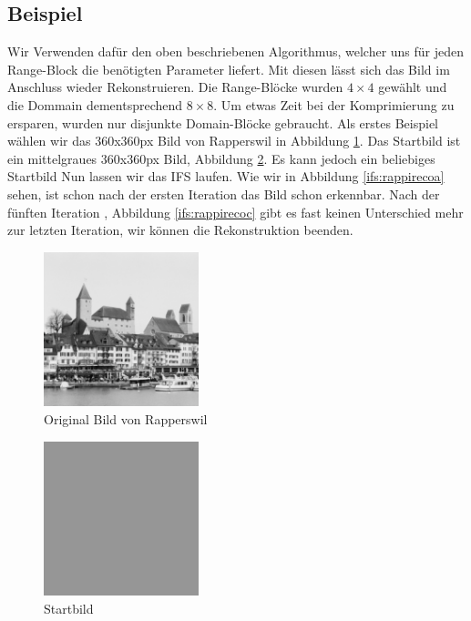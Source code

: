 \subsection{Beispiel}
Wir Verwenden dafür den oben beschriebenen Algorithmus, welcher uns für jeden Range-Block die benötigten Parameter liefert.
Mit diesen lässt sich das Bild im Anschluss wieder Rekonstruieren.
Die Range-Blöcke wurden $4\times4$ gewählt und die Dommain dementsprechend $8\times8$.
Um etwas Zeit bei der Komprimierung zu ersparen, wurden nur disjunkte Domain-Blöcke gebraucht.
Als erstes Beispiel wählen wir das 360x360px Bild von Rapperswil in Abbildung \ref{ifs:original}.
Das Startbild ist ein mittelgraues 360x360px Bild, Abbildung \ref{ifs:bild0}.
Es kann jedoch ein beliebiges Startbild
Nun lassen wir das IFS laufen.
Wie wir in Abbildung \ref{ifs:rappirecoa} sehen, ist schon nach der ersten Iteration das Bild schon erkennbar.
Nach der fünften Iteration , Abbildung \ref{ifs:rappirecoc} gibt es fast keinen Unterschied mehr zur letzten Iteration, wir können die Rekonstruktion beenden.
\begin{figure}	
	\centering
	\includegraphics[width=0.4\textwidth]{papers/ifs/images/original}
	\caption{Original Bild von Rapperswil}
	\label{ifs:original}
\end{figure}
\begin{figure}
	\centering
	\includegraphics[width=0.4\textwidth]{papers/ifs/images/rapperswil}
	\caption{Startbild}
	\label{ifs:bild0}
\end{figure}

